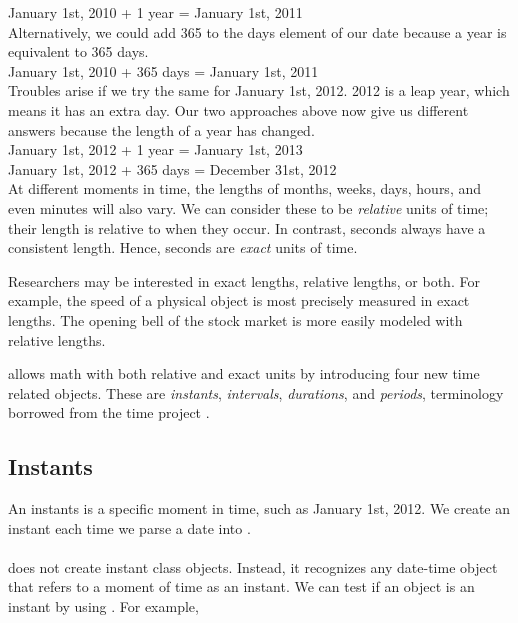 \documentclass[article]{jss}
\begin{document}
January 1st, 2010 + 1 year = January 1st, 2011\\

Alternatively, we could add 365 to the days element of our date because a year is equivalent to 365 days. \\

January 1st, 2010 + 365 days = January 1st, 2011\\

Troubles arise if we try the same for January 1st, 2012. 2012 is a leap year, which means it has an extra day. Our two approaches above now give us different answers because the length of a year has changed.\\ 

January 1st, 2012 + 1 year = January 1st, 2013\\
January 1st, 2012 + 365 days = December 31st,  2012\\

At different moments in time, the lengths of months, weeks, days, hours, and even minutes will also vary. We can consider these to be \emph{relative} units of time; their length is relative to when they occur. In contrast, seconds always have a consistent length. Hence, seconds are \emph{exact} units of time.

Researchers may be interested in exact lengths, relative lengths, or both. For example, the speed of a physical object is most precisely measured in exact lengths. The opening bell of the stock market is more easily modeled with relative lengths.

 allows math with both relative and exact units by introducing four new time related objects. These are \emph{instants}, \emph{intervals}, \emph{durations}, and \emph{periods}, terminology borrowed from the  time project \citep{jodatime}. 

\subsection{Instants}
\label{sec:instants}

An instants is a specific moment in time, such as January 1st, 2012. We create an instant each time we parse a date into . \\

\\

 does not create instant class objects. Instead, it recognizes any date-time object that refers to a moment of time as an instant. We can test if an object is an instant by using . For example,\\
\end{document}
